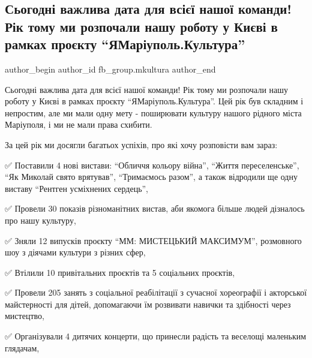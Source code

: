  
 
 
 
 

\subsection{Сьогодні важлива дата для всієї нашої команди! Рік тому ми розпочали нашу роботу у Києві в рамках проєкту \enquote{ЯМаріуполь.Культура}}
\label{sec:21_06_2023.fb.fb_group.mkultura.1.nasha_robota_v_kyevi_ja_mariupol_kultura}

\ifcmt
 author_begin
   author_id fb_group.mkultura
 author_end
\fi

Сьогодні важлива дата для всієї нашої команди! Рік тому ми розпочали нашу
роботу у Києві в рамках проєкту \enquote{ЯМаріуполь.Культура}. Цей рік був складним і
непростим, але ми мали одну мету - поширювати культуру нашого рідного міста
Маріуполя, і ми не мали права схибити.

За цей рік ми досягли багатьох успіхів, про які хочу розповісти вам зараз:

✅ Поставили 4 нові  вистави: \enquote{Обличчя кольору війна}, \enquote{Життя переселенське},
\enquote{Як Миколай свято врятував}, \enquote{Тримаємось разом}, а також відродили ще одну
виставу \enquote{Рентген усміхнених сердець},

✅ Провели 30 показів різноманітних вистав, аби якомога більше людей дізналось
про нашу культуру, 

✅ Зняли 12 випусків проєкту \enquote{ММ: МИСТЕЦЬКИЙ МАКСИМУМ}, розмовного шоу з
діячами культури з різних сфер,

✅ Втілили 10 привітальних проєктів та 5 соціальних проєктів,

✅ Провели 205 занять з соціальної реабілітації з сучасної хореографії і
акторської майстерності для дітей, допомагаючи їм розвивати навички та
здібності через мистецтво,

✅ Організували 4 дитячих концерти, що принесли радість та веселощі маленьким
глядачам,

